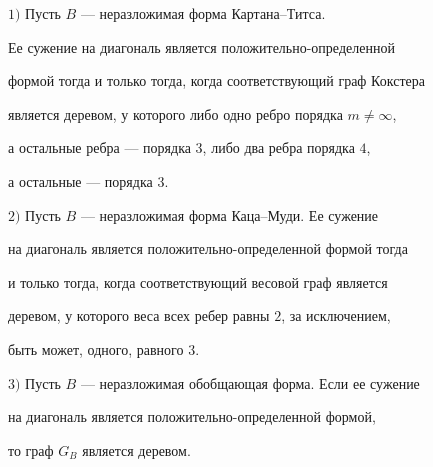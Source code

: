  


\begin{thm} 


$1)$ Пусть $B$ --- неразложимая форма Картана--Титса. 


Ее сужение на диагональ является положительно-определенной 


формой тогда и только тогда, когда соответствующий граф Кокстера 


является деревом, у которого либо одно ребро порядка $m\ne\infty$, 


а остальные ребра --- порядка $3$, либо два ребра порядка $4$, 


а остальные --- порядка $3$. 


 


$2)$ Пусть $B$ --- неразложимая форма Каца--Муди. Ее сужение 


на диагональ является положительно-определенной формой тогда 


и только тогда, когда соответствующий весовой граф является 


деревом, у которого веса всех ребер равны $2$, за исключением, 


быть может, одного, равного $3$. 


 


$3)$ Пусть $B$ --- неразложимая обобщающая форма. Если ее сужение 


на диагональ является положительно-определенной формой, 


то граф $G_B$ является деревом. 


\end{thm} 


 


